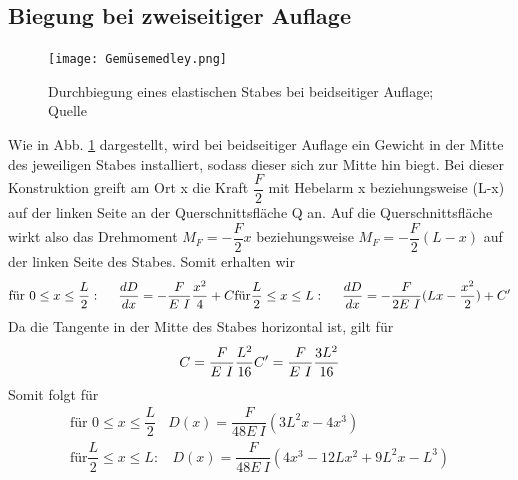 \subsection{Biegung bei zweiseitiger Auflage}
    \begin{figure}
        \centering
        \texttt{[image: Gemüsemedley.png]}
        \caption{Durchbiegung eines elastischen Stabes bei beidseitiger Auflage; Quelle \cite{sample}}
        \label{fig:gemüse}
    \end{figure}
    Wie in Abb. \ref{fig:gemüse} dargestellt, wird bei beidseitiger Auflage ein Gewicht in der Mitte des 
    jeweiligen Stabes installiert, sodass dieser sich zur Mitte hin biegt. Bei dieser 
    Konstruktion greift am Ort x die Kraft $\dfrac{F}{2}$ mit Hebelarm x 
    beziehungsweise (L-x) auf der linken Seite an der Querschnittsfläche Q
    an. Auf die Querschnittsfläche wirkt also das Drehmoment $M_F = -\dfrac{F}{2} x$ 
    beziehungsweise $M_F = -\dfrac{F}{2}(L-x)$ auf der linken Seite des Stabes.
    Somit erhalten wir 
    \begin{equation}
        \text{für } 0 \leq x \leq \dfrac{L}{2}:\ \ \ \ \dfrac{d D}{dx}=-\dfrac{F}{E\ I}\dfrac{x^2}{4}+C \\
        \text{für} \dfrac{L}{2} \leq x \leq L:\ \ \ \ \dfrac{d D}{dx}=-\dfrac{F}{2 E\ I}(Lx - \dfrac{x^2}{2})+C'
    \end{equation}
    Da die Tangente in der Mitte des Stabes horizontal ist, gilt für 
    \begin{equation*}
        C = \dfrac{F}{E\ I}\dfrac{L^2}{16} \\
        C'=\dfrac{F}{E\ I}\dfrac{3L^2}{16}
    \end{equation*}
    Somit folgt für 
    \begin{align}
        \text{für } 0 \leq x \leq \dfrac{L}{2}\ \ \ \ D(x)=\dfrac{F}{48 E\ I}(3L^2x-4x^3) \\
        \text{für} \dfrac{L}{2} \leq x \leq L:\ \ \ \ D(x)=\dfrac{F}{48 E\ I}(4 x^3-12Lx^2+9L^2x-L^3) 
    \end{align}

